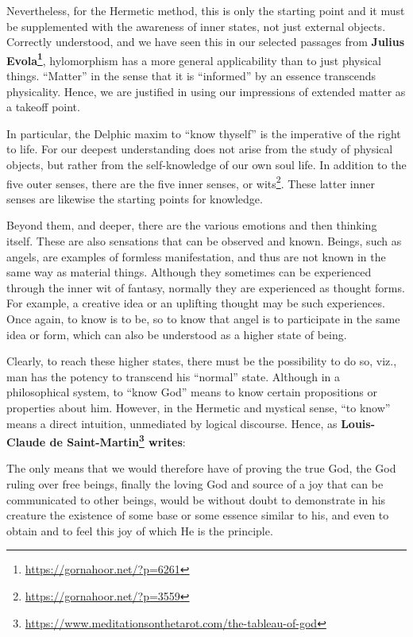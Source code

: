 Nevertheless, for the Hermetic method, this is only the starting point and it must be supplemented with the awareness of inner states, not just external objects. Correctly understood, and we have seen this in our selected passages from \textbf{Julius Evola\footnote{\url{https://gornahoor.net/?p=6261}}}, hylomorphism has a more general applicability than to just physical things. ``Matter'' in the sense that it is ``informed'' by an essence transcends physicality. Hence, we are justified in using our impressions of extended matter as a takeoff point.

In particular, the Delphic maxim to ``know thyself'' is the imperative of the right to life. For our deepest understanding does not arise from the study of physical objects, but rather from the self-knowledge of our own soul life. In addition to the five outer senses, there are the five inner senses, or wits\footnote{\url{https://gornahoor.net/?p=3559}}. These latter inner senses are likewise the starting points for knowledge.

Beyond them, and deeper, there are the various emotions and then thinking itself. These are also sensations that can be observed and known. Beings, such as angels, are examples of formless manifestation, and thus are not known in the same way as material things. Although they sometimes can be experienced through the inner wit of fantasy, normally they are experienced as thought forms. For example, a creative idea or an uplifting thought may be such experiences. Once again, to know is to be, so to know that angel is to participate in the same idea or form, which can also be understood as a higher state of being.

Clearly, to reach these higher states, there must be the possibility to do so, viz., man has the potency to transcend his ``normal'' state. Although in a philosophical system, to ``know God'' means to know certain propositions or properties about him. However, in the Hermetic and mystical sense, ``to know'' means a direct intuition, unmediated by logical discourse. Hence, as \textbf{Louis-Claude de Saint-Martin\footnote{\url{https://www.meditationsonthetarot.com/the-tableau-of-god}} writes}:

\begin{quotex}
The only means that we would therefore have of proving the true God, the God ruling over free beings, finally the loving God and source of a joy that can be communicated to other beings, would be without doubt to demonstrate in his creature the existence of some base or some essence similar to his, and even to obtain and to feel this joy of which He is the principle.
\end{quotex}


